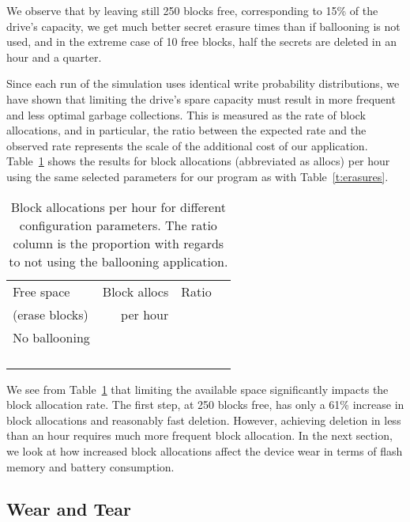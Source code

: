 \documentclass{acmtog}
\begin{document}
We observe
that by leaving still 250 blocks free, corresponding to 15\% of the drive's
capacity,  we get much better secret
erasure times than if ballooning is not used, and in the extreme case of 10 free blocks,
half the secrets are deleted in an hour and a quarter.  

Since each run of the simulation uses identical write probability distributions,
we have
shown that limiting the drive's spare capacity must result in more frequent and less optimal
garbage collections. This is measured as the rate of block allocations, and in
particular, the ratio between the expected rate and the
observed rate represents the scale of the additional cost of our application.
Table~\ref{t:allocations} shows the results for block allocations (abbreviated
as allocs) per hour
using the same selected parameters for our program as with
Table~\ref{t:erasures}.


\begin{table}[t]
\centering
\begin{tabular}{lrrr}
\hline
Free space   & Block allocs & Ratio  \\
(erase blocks)  & per hour&  \\
\hline
No ballooning &  &    \\
 &  &   \\


 &   &   \\ 
 &  &    \\
 &  &   \\



\hline

\end{tabular}
\caption{\small Block allocations per hour for different configuration
parameters. The
ratio column is the proportion with regards to not using the ballooning
application.
\label{t:allocations}\normalsize}
\end{table}

We see from Table~\ref{t:allocations} that limiting the available space
significantly impacts the block allocation rate. The first step, at 250 blocks free, has
only a 61\% increase in block allocations and reasonably fast deletion.
However, achieving deletion in less than an hour requires much more
frequent block allocation. In the next section, we look at how increased block
allocations affect the device wear in terms of flash memory and
battery consumption.


\subsection{Wear and Tear}
\end{document}
